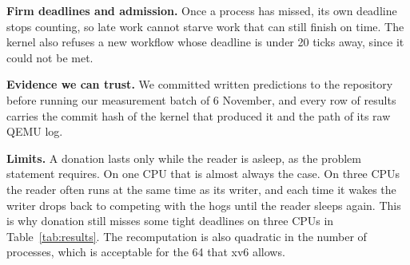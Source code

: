 \documentclass[10pt,a4paper]{article}
\begin{document}
\textbf{Firm deadlines and admission.} Once a process has missed, its own deadline stops counting, so late work cannot starve work that can still finish on time. The kernel also refuses a new workflow whose deadline is under 20 ticks away, since it could not be met.

\textbf{Evidence we can trust.} We committed written predictions to the repository before running our measurement batch of 6 November, and every row of results carries the commit hash of the kernel that produced it and the path of its raw QEMU log.

\textbf{Limits.} A donation lasts only while the reader is asleep, as the problem statement requires. On one CPU that is almost always the case. On three CPUs the reader often runs at the same time as its writer, and each time it wakes the writer drops back to competing with the hogs until the reader sleeps again. This is why donation still misses some tight deadlines on three CPUs in Table~\ref{tab:results}. The recomputation is also quadratic in the number of processes, which is acceptable for the 64 that xv6 allows.
\end{document}
